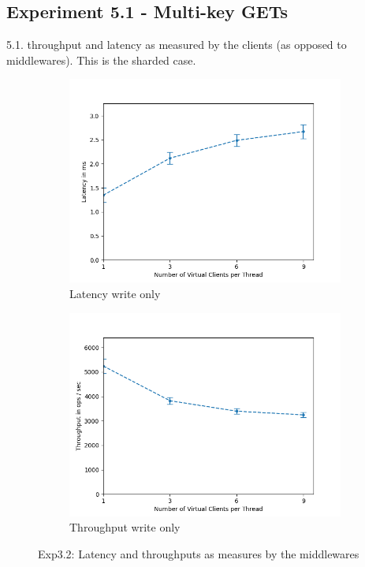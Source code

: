 \documentclass[11pt,a4paper]{article}
\begin{document}
\subsection{Experiment 5.1 - Multi-key GETs}
5.1. throughput and latency as measured by the clients (as opposed to middlewares).
This is the sharded case.

\begin{figure}[H]
\centering
\begin{subfigure}{.5\textwidth}
    \centering
    \includegraphics[width=\textwidth]{img/exp5_1/exp5_1__mw_latency_sharding_True.png}
    \caption{Latency write only}
    \label{fig:mesh1}
\end{subfigure}%
\begin{subfigure}{.5\textwidth}
      \centering
    \includegraphics[width=\textwidth]{img/exp5_1/exp5_1__mw_throughput_sharding_True.png}
    \caption{Throughput write only}
    \label{fig:mesh1}
\end{subfigure}
\caption{Exp3.2: Latency and throughputs as measures by the middlewares}
\label{fig:test}
\end{figure}
\end{document}
